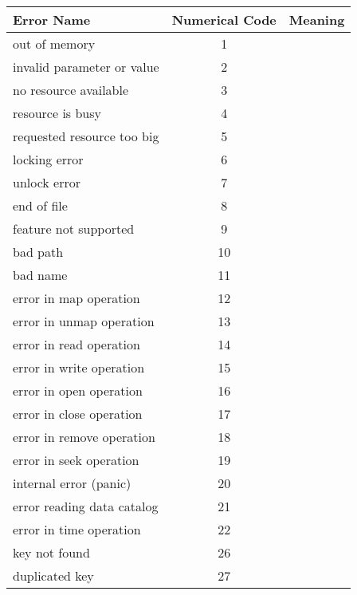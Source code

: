\bgroup
\renewcommand{\arraystretch}{1.3}
\begin{center}
\begin{longtable}{||l||c||l||}\hline
\textbf{Error Name} & \textbf{Numerical Code} & \textbf{Meaning} \\\hline\endhead\hline

out of memory                   &      1 & \\\hline\hline
invalid parameter or value      &      2 & \\\hline\hline
no resource available           &      3 & \\\hline\hline
resource is busy                &      4 & \\\hline\hline
requested resource too big      &      5 & \\\hline\hline
locking error                   &      6 & \\\hline\hline
unlock error                    &      7 & \\\hline\hline
end of file                     &      8 & \\\hline\hline
feature not supported           &      9 & \\\hline\hline
bad path                        &     10 & \\\hline\hline
bad name                        &     11 & \\\hline\hline
error in map operation          &     12 & \\\hline\hline
error in unmap operation        &     13 & \\\hline\hline
error in read operation         &     14 & \\\hline\hline
error in write operation        &     15 & \\\hline\hline
error in open operation         &     16 & \\\hline\hline
error in close operation        &     17 & \\\hline\hline
error in remove operation       &     18 & \\\hline\hline
error in seek operation         &     19 & \\\hline\hline
internal error (panic)          &     20 & \\\hline\hline
error reading data catalog      &     21 & \\\hline\hline
error in time operation         &     22 & \\\hline\hline
key not found                   &     26 & \\\hline\hline
duplicated key                  &     27 & \\\hline\hline

\end{longtable}
\end{center}
